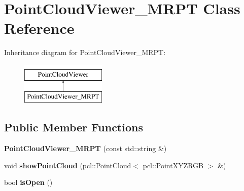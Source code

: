 \hypertarget{class_point_cloud_viewer___m_r_p_t}{
\section{PointCloudViewer\_\-MRPT Class Reference}
\label{class_point_cloud_viewer___m_r_p_t}
}
Inheritance diagram for PointCloudViewer\_\-MRPT:\begin{figure}[H]
\begin{center}
\leavevmode
\includegraphics[height=2.000000cm]{class_point_cloud_viewer___m_r_p_t}
\end{center}
\end{figure}
\subsection*{Public Member Functions}
\begin{DoxyCompactItemize}
\item 
\hypertarget{class_point_cloud_viewer___m_r_p_t_a8c804b0f876740a8c1ad816250eb1bde}{
{\bfseries PointCloudViewer\_\-MRPT} (const std::string \&)}
\label{class_point_cloud_viewer___m_r_p_t_a8c804b0f876740a8c1ad816250eb1bde}

\item 
\hypertarget{class_point_cloud_viewer___m_r_p_t_a0d075bd0649fece16c544ff29ab8bfea}{
void {\bfseries showPointCloud} (pcl::PointCloud$<$ pcl::PointXYZRGB $>$ \&)}
\label{class_point_cloud_viewer___m_r_p_t_a0d075bd0649fece16c544ff29ab8bfea}

\item 
\hypertarget{class_point_cloud_viewer___m_r_p_t_ae531a413cdb4ed13e0e68d380dec6bad}{
bool {\bfseries isOpen} ()}
\label{class_point_cloud_viewer___m_r_p_t_ae531a413cdb4ed13e0e68d380dec6bad}

\end{DoxyCompactItemize}
